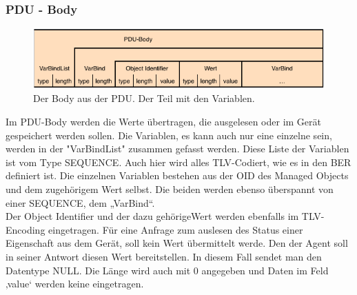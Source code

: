\documentclass[11pt,a4paper]{article}
\begin{document}
\subsubsection{PDU - Body}
\begin{figure}[h]
	\centering
	\includegraphics[scale=.8]{Bilder/SNMPv1-PDU-Body.png}
	\caption{Der Body aus der PDU. Der Teil mit den Variablen.}
\end{figure}
Im PDU-Body werden die Werte übertragen, die ausgelesen oder im Gerät gespeichert werden sollen. Die Variablen, es kann auch nur eine einzelne sein, werden in der "VarBindList" zusammen gefasst werden. Diese Liste der Variablen ist vom Type SEQUENCE. Auch hier wird alles TLV-Codiert, wie es in den BER definiert ist. Die einzelnen Variablen bestehen aus der OID des Managed Objects und dem zugehörigem Wert selbst. Die beiden werden ebenso überspannt von einer SEQUENCE, dem „VarBind“.\\
Der Object Identifier und der dazu gehörigeWert werden ebenfalls im TLV-Encoding eingetragen. Für eine Anfrage zum auslesen des Status einer Eigenschaft aus dem Gerät, soll kein Wert übermittelt werde. Den der Agent soll in seiner Antwort diesen Wert bereitstellen. In diesem Fall sendet man den Datentype NULL. Die Länge wird auch mit 0 angegeben und Daten im Feld ‚value‘ werden keine eingetragen.\\
\end{document}
